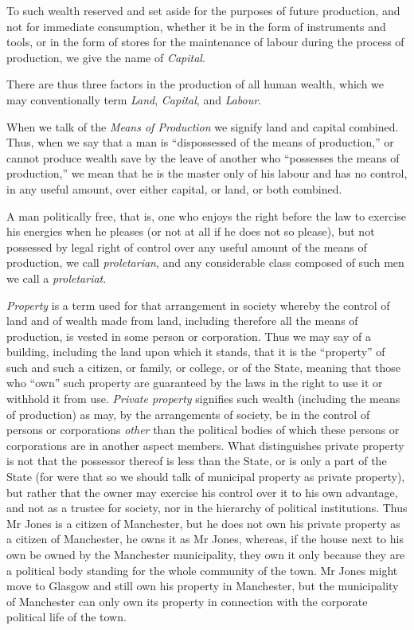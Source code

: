 \documentclass{book}
\begin{document}
To such wealth reserved and set aside for the purposes of future production, and not for immediate consumption, whether it be in the form of instruments and tools, or in the form of stores for the maintenance of labour during the process of production, we give the name of \emph{Capital}.

There are thus three factors in the production of all human wealth, which we may conventionally term \emph{Land}, \emph{Capital}, and \emph{Labour}.

When we talk of the \emph{Means of Production} we signify land and capital combined. Thus, when we say that a man is “dispossessed of the means of production,” or cannot produce wealth save by the leave of another who “possesses the means of production,” we mean that he is the master only of his labour and has no control, in any useful amount, over either capital, or land, or both combined.

A man politically free, that is, one who enjoys the right before the law to exercise his energies when he pleases (or not at all if he does not so please), but not possessed by legal right of control over any useful amount of the means of production, we call \emph{proletarian}, and any considerable class composed of such men we call a \emph{proletariat}.

\emph{Property} is a term used for that arrangement in society whereby the control of land and of wealth made from land, including therefore all the means of production, is vested in some person or corporation. Thus we may say of a building, including the land upon which it stands, that it is the “property” of such and such a citizen, or family, or college, or of the State, meaning that those who “own” such property are guaranteed by the laws in the right to use it or withhold it from use. \emph{Private property} signifies such wealth (including the means of production) as may, by the arrangements of society, be in the control of persons or corporations \emph{other} than the political bodies of which these persons or corporations are in another aspect members. What distinguishes private property is not that the possessor thereof is less than the State, or is only a part of the State (for were that so we should talk of municipal property as private property), but rather that the owner may exercise his control over it to his own advantage, and not as a trustee for society, nor in the hierarchy of political institutions. Thus Mr Jones is a citizen of Manchester, but he does not own his private property as a citizen of Manchester, he owns it as Mr Jones, whereas, if the house next to his own be owned by the Manchester municipality, they own it only because they are a political body standing for the whole community of the town. Mr Jones might move to Glasgow and still own his property in Manchester, but the municipality of Manchester can only own its property in connection with the corporate political life of the town.
\end{document}
